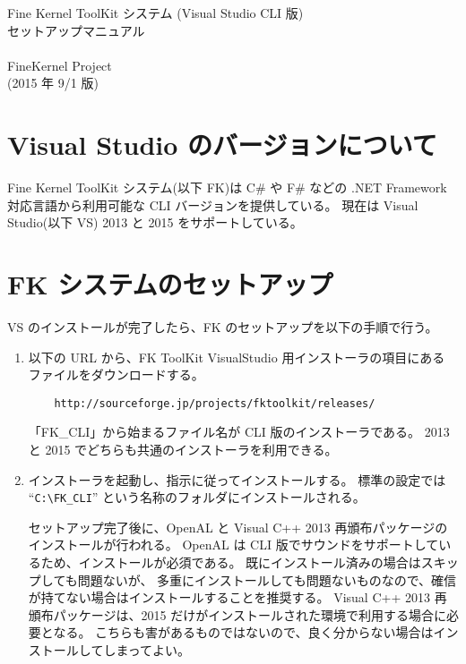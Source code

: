 \documentclass[a4j]{jarticle}
\begin{document}
\begin{center}
{\Large Fine Kernel ToolKit システム (Visual Studio CLI 版) \\
	セットアップマニュアル} \\ ~ \\
{\Large FineKernel Project} \\
(2015 年 9/1 版)
\end{center}


\section{Visual Studio のバージョンについて}
Fine Kernel ToolKit システム(以下 FK)は 
C# や F# などの .NET Framework 対応言語から利用可能な CLI バージョンを提供している。
現在は Visual Studio(以下 VS) 2013 と 2015 をサポートしている。

\section{FK システムのセットアップ}
VS のインストールが完了したら、FK のセットアップを以下の手順で行う。

\begin{enumerate}
\item 以下の URL から、FK ToolKit VisualStudio 用インストーラの項目にある
ファイルをダウンロードする。

\begin{verbatim}
    http://sourceforge.jp/projects/fktoolkit/releases/
\end{verbatim}

「FK\_CLI」から始まるファイル名が CLI 版のインストーラである。
2013 と 2015 でどちらも共通のインストーラを利用できる。

\item インストーラを起動し、指示に従ってインストールする。
標準の設定では ``\verb+C:\FK_CLI+'' という名称のフォルダにインストールされる。

セットアップ完了後に、OpenAL と Visual C++ 2013 再頒布パッケージのインストールが行われる。
OpenAL は CLI 版でサウンドをサポートしているため、インストールが必須である。
既にインストール済みの場合はスキップしても問題ないが、
多重にインストールしても問題ないものなので、確信が持てない場合はインストールすることを推奨する。
Visual C++ 2013 再頒布パッケージは、2015 だけがインストールされた環境で利用する場合に必要となる。
こちらも害があるものではないので、良く分からない場合はインストールしてしまってよい。

\end{enumerate}
\end{document}
